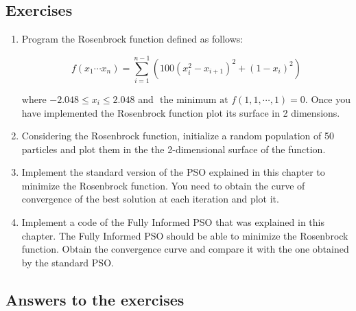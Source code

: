 \subsection{Exercises}
\label{sec:exeercises}

\begin{enumerate}
    \item Program the Rosenbrock function defined as follows:
    
    \begin{equation} \label{eq:rosen}
    f(x_1 \cdots x_n) = \sum_{i=1}^{n-1} (100(x_i^2 - x_{i+1})^2 + (1-x_i)^2)
\end{equation}

\noindent where $-2.048 \leq x_i \leq 2.048$ and $\text{ the minimum at }f(1, 1, \cdots, 1) = 0$.  Once you have implemented the Rosenbrock function plot its surface in 2 dimensions.

    \item Considering the Rosenbrock function, initialize a random population of 50 particles and plot them in the the 2-dimensional surface of the function.
    
    \item Implement the standard version of the PSO explained in this chapter to minimize the Rosenbrock function. You need to obtain the curve of convergence of the best solution at each iteration and plot it.
    
    \item Implement a code of the Fully Informed PSO that was explained in this chapter. The Fully Informed PSO should be able to minimize the Rosenbrock function. Obtain the convergence curve and compare it with the one obtained by the standard PSO. 
    
\end{enumerate}

\subsection{Answers to the exercises}
\label{sec:answers}

